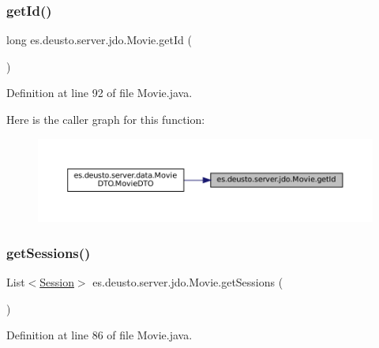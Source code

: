 \subsubsection{\texorpdfstring{getId()}{getId()}}
{\footnotesize\ttfamily long es.\+deusto.\+server.\+jdo.\+Movie.\+get\+Id (\begin{DoxyParamCaption}{ }\end{DoxyParamCaption})}



Definition at line 92 of file Movie.\+java.

Here is the caller graph for this function\+:
\nopagebreak
\begin{figure}[H]
\begin{center}
\leavevmode
\includegraphics[width=350pt]{classes_1_1deusto_1_1server_1_1jdo_1_1_movie_a4d2758ed2b7a03bd95646f67c046e043_icgraph}
\end{center}
\end{figure}
\mbox{\label{classes_1_1deusto_1_1server_1_1jdo_1_1_movie_a8d94f72339ed5601515e139de313e181}} 
\subsubsection{\texorpdfstring{getSessions()}{getSessions()}}
{\footnotesize\ttfamily List$<$\mbox{\hyperlink{classes_1_1deusto_1_1server_1_1jdo_1_1_session}{Session}}$>$ es.\+deusto.\+server.\+jdo.\+Movie.\+get\+Sessions (\begin{DoxyParamCaption}{ }\end{DoxyParamCaption})}



Definition at line 86 of file Movie.\+java.

